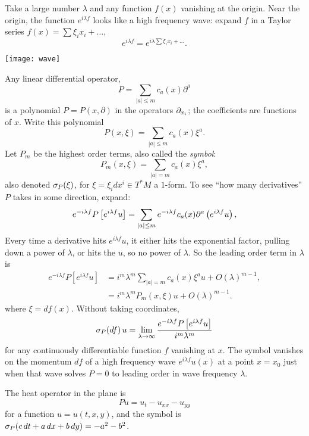 Take a large number \(\lambda\) and any function \(f(x)\) vanishing at the origin.
Near the origin, the function \(e^{i\lambda f}\) looks like a high frequency wave: expand \(f\) in a Taylor series \(f(x)=\sum \xi_i x_i + \dots\),
\[
e^{i\lambda f} = e^{i \lambda \sum \xi_i x_i + \dots}.
\]
\begin{center}
\texttt{[image: wave]}
\end{center}
Any linear differential operator,
\[
P=\sum_{|a|\le m} c_a(x) \partial^a
\]
is a polynomial \(P=P(x,\partial)\) in the operators \(\partial_{x_i}\); the coefficients are functions of \(x\).
Write this polynomial
\[
P(x,\xi)=
\sum_{|a|\le m} c_a(x) \xi^a.
\]
Let \(P_m\) be the highest order terms, also called the \emph{symbol}:
\[
P_m(x,\xi)=\sum_{|a|=m} c_a(x) \xi^a,
\]
also denoted \(\opsymbol[P]{\xi}\), for \(\xi=\xi_i dx^i \in T^* M\) a \(1\)-form.
To see ``how many derivatives'' \(P\) takes in some direction, expand:
\[
e^{-i\lambda f}P\left[e^{i \lambda f}u\right]
=
\sum_{|a|\le m} e^{-i\lambda f}c_a(x) \partial^a \left(e^{i\lambda f}u\right),
\]
Every time a derivative hits \(e^{i\lambda f}u\), it either hits the exponential factor, pulling down a power of \(\lambda\), or hits the \(u\), so no power of \(\lambda\).
So the leading order term in \(\lambda\) is
\begin{align*}
e^{-i\lambda f}P\left[e^{i \lambda f}u\right]
&=i^m \lambda^m \sum_{|a|=m} c_a(x) \xi^a u + O(\lambda)^{m-1},
\\
&=i^m\lambda^mP_m(x,\xi)u+O(\lambda)^{m-1}.
\end{align*}
where \(\xi=df(x)\).
Without taking coordinates,
\[
\opsymbol[P]{df}u=\lim_{\lambda \to \infty} \frac{e^{-i\lambda f} P \left[e^{i\lambda f}u\right]}{i^m\lambda^m}
\]
for any continuously differentiable function \(f\) vanishing at \(x\).
The symbol vanishes on the momentum \(df\) of a high frequency wave \(e^{i\lambda f}u(x)\) at a point \(x=x_0\) just when that wave solves \(P=0\) to leading order in wave frequency \(\lambda\).
\begin{example}
The heat operator in the plane is
\[
Pu=u_t-u_{xx}-u_{yy}
\]
for a function \(u=u(t,x,y)\), and the symbol is \(\opsymbol[P]{c \, dt + a \, dx + b \, dy}=-a^2-b^2\).
\end{example}

